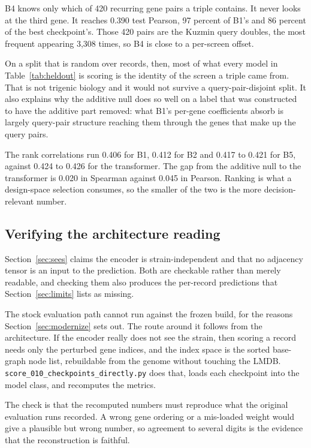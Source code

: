 B4 knows only which of 420 recurring gene pairs a triple contains. It never
looks at the third gene. It reaches 0.390 test Pearson, 97 percent of B1's and
86 percent of the best checkpoint's. Those 420 pairs are the Kuzmin query
doubles, the most frequent appearing 3{,}308 times, so B4 is close to a
per-screen offset.

On a split that is random over records, then, most of what every model in
Table~\ref{tab:heldout} is scoring is the identity of the screen a triple came
from. That is not trigenic biology and it would not survive a query-pair-disjoint
split. It also explains why the additive null does so well on a label that was
constructed to have the additive part removed: what B1's per-gene coefficients
absorb is largely query-pair structure reaching them through the genes that make
up the query pairs.

The rank correlations run 0.406 for B1, 0.412 for B2 and 0.417 to 0.421 for B5,
against 0.424 to 0.426 for the transformer. The gap from the additive null to
the transformer is 0.020 in Spearman against 0.045 in Pearson. Ranking is what
a design-space selection consumes, so the smaller of the two is the more
decision-relevant number.

\subsection{Verifying the architecture reading}
\label{sec:verify}

Section~\ref{sec:sees} claims the encoder is strain-independent and that no
adjacency tensor is an input to the prediction. Both are checkable rather than
merely readable, and checking them also produces the per-record predictions that
Section~\ref{sec:limits} lists as missing.

The stock evaluation path cannot run against the frozen build, for the reasons
Section~\ref{sec:modernize} sets out. The
route around it follows from the architecture. If the encoder really does not
see the strain, then scoring a record needs only the perturbed gene indices, and
the index space is the sorted base-graph node list, rebuildable from the genome
without touching the LMDB.
\texttt{score\_010\_checkpoints\_directly.py} does that, loads each checkpoint
into the model class, and recomputes the metrics.

The check is that the recomputed numbers must reproduce what the original
evaluation runs recorded. A wrong gene ordering or a mis-loaded weight would
give a plausible but wrong number, so agreement to several digits is the
evidence that the reconstruction is faithful.

